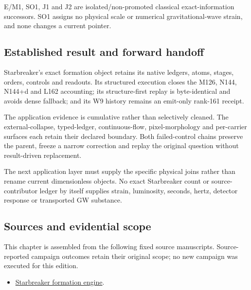 E/M1, SO1, J1 and J2 are isolated/non-promoted classical
exact-information successors. SO1 assigns no physical scale or numerical
gravitational-wave strain, and none changes a current pointer.

\subsection{Established result and forward
handoff}\label{viii-ch08-established-result-and-forward-handoff}

Starbreaker's exact formation object retains its native ledgers, atoms,
stages, orders, controls and readouts. Its structured execution closes
the M126, N144, N144+d and L162 accounting; its structure-first replay
is byte-identical and avoids dense fallback; and its W9 history remains
an emit-only rank-161 receipt.

The application evidence is cumulative rather than selectively cleaned.
The external-collapse, typed-ledger, continuous-flow, pixel-morphology
and per-carrier surfaces each retain their declared boundary. Both
failed-control chains preserve the parent, freeze a narrow correction
and replay the original question without result-driven replacement.

The next application layer must supply the specific physical joins
rather than rename current dimensionless objects. No exact Starbreaker
count or source-contributor ledger by itself supplies strain,
luminosity, seconds, hertz, detector response or transported GW
substance.

\subsection{Sources and evidential
scope}\label{viii-ch08-sources-and-evidential-scope}

This chapter is assembled from the following fixed source manuscripts.
Source-reported campaign outcomes retain their original scope; no new
campaign was executed for this edition.

\begin{itemize}
\tightlist
\item
  \href{https://github.com/iwtbotiwtwot/SAMA/blob/4c2b5dc1649da5900c90b90d0ce56c223dbb7717/vol_iii/04-starbreaker/starbreaker-formation-engine.md}{Starbreaker
  formation engine}.
\end{itemize}
